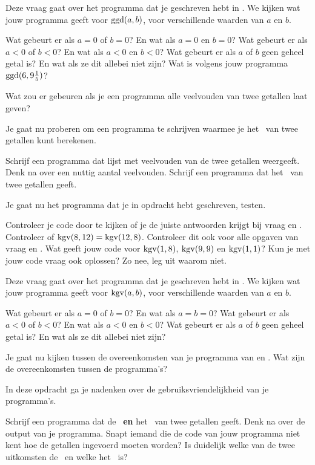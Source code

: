 \opdracht[4] \label{randvoorw}%
Deze vraag gaat over het programma dat je geschreven hebt in . We kijken wat jouw programma geeft voor $\operatorname{ggd}(a,b)$, voor verschillende waarden van $a$ en $b$.

\? Wat gebeurt er als $a=0$  of $b=0$? En wat als $a=0$ en $b=0$?
\? Wat gebeurt er als $a<0$ of $b<0$? En wat als $a<0$ en $b<0$?\label{negatief}
\? Wat gebeurt er als $a$ of $b$ geen geheel getal is? En wat als ze dit allebei niet zijn?
\? Wat is volgens jouw programma $\operatorname{ggd}(6,9\frac{1}{5})$?

\opdracht[2]  Wat zou er gebeuren als je een programma alle veelvouden van twee getallen laat geven?

\opdracht[3] \label{kgvopdr}%
Je gaat nu proberen om een programma te schrijven waarmee je het \kgv\ van twee getallen kunt berekenen. 

\? Schrijf een programma dat lijst met veelvouden van de twee getallen weergeeft. Denk na over een nuttig aantal veelvouden.
\? Schrijf een programma dat het \kgv\ van twee getallen geeft.\label{kgvopdreind}

\opdracht[3] Je gaat nu het programma dat je in opdracht  hebt geschreven, testen.

\? Controleer je code door te kijken of je de juiste antwoorden krijgt bij vraag  en .
\? Controleer of $\operatorname{kgv}(8,12)=\operatorname{kgv}(12,8)$. Controleer dit ook voor alle opgaven van vraag  en .
\? Wat geeft jouw code voor $\operatorname{kgv}(1,8)$, $\operatorname{kgv}(9,9)$ en $\operatorname{kgv}(1,1)$?
\? Kun je met jouw code vraag  ook oplossen? Zo nee, leg uit waarom niet.

\opdracht[4] Deze vraag gaat over het programma dat je geschreven hebt in . We kijken wat jouw programma geeft voor $\operatorname{kgv}(a,b)$, voor verschillende waarden van $a$ en $b$.

\? Wat gebeurt er als $a=0$  of $b=0$? En wat als $a=b=0$?
\? Wat gebeurt er als $a<0$ of $b<0$? En wat als $a<0$ en $b<0$?
\? Wat gebeurt er als $a$ of $b$ geen geheel getal is? En wat als ze dit allebei niet zijn?

\opdracht[5] Je gaat nu kijken tussen de overeenkomsten van je programma van  en . 
Wat zijn de overeenkomsten tussen de programma's?

\opdracht[6]In deze opdracht ga je nadenken over de gebruiksvriendelijkheid van je programma's.

\? Schrijf een programma dat  de \ggd\ \textbf{en} het \kgv\ van twee getallen geeft.
\? Denk na over de output van je programma. Snapt iemand die de code van jouw programma niet kent hoe de getallen ingevoerd moeten worden? Is duidelijk welke van de twee uitkomsten de \ggd\ en welke het \kgv\ is?